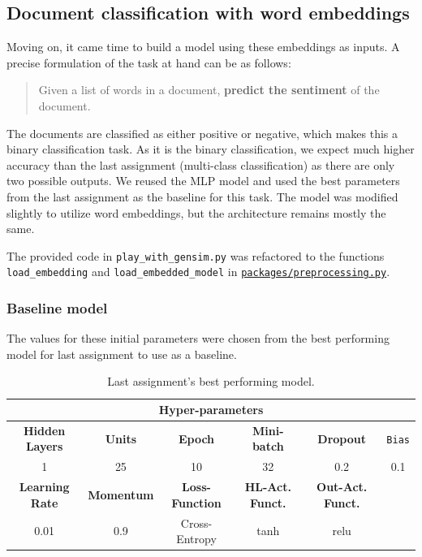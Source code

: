 \subsection{Document classification with word embeddings}
\label{chap:Document classification with word embeddings}
\quad Moving on, it came time to build a model using these embeddings as inputs. A precise formulation of the task at hand can be as follows:

\begin{quote}
    Given a list of words in a document, \textbf{predict the sentiment} of the document. 
\end{quote} 

The documents are classified as either positive or negative, which makes this a binary classification task. As it is the binary classification, we expect much higher accuracy than the last assignment (multi-class classification) as there are only two possible outputs. We reused the MLP model and used the best parameters from the last assignment as the baseline for this task. The model was modified slightly to utilize word embeddings, but the architecture remains mostly the same. 

The provided code in \texttt{play\_with\_gensim.py} was refactored to the functions \texttt{load\_embedding} and \texttt{load\_embedded\_model} in \href{https://github.uio.no/fabior/IN5550/blob/master/Oblig2/packages/preprocessing.py}{\texttt{packages/preprocessing.py}}.
\newline

\subsubsection{Baseline model}
The values for these initial parameters were chosen from the best performing model for last assignment to use as a baseline.
\begin{table}[H]
    \centering
    \begin{tabular}{ |c|c|c|c|c|c| }
        \hline
        \multicolumn{6}{|c|}{\textbf{Hyper-parameters}} \\
        \hline
        \textbf{Hidden Layers} & \textbf{Units} & \textbf{Epoch} & \textbf{Mini-batch} & \textbf{Dropout} & \texttt{Bias} \\
        \hline
        1 & 25 & 10 & 32 & 0.2 & 0.1 \\
        \hline
         \textbf{Learning Rate} & \textbf{Momentum} & \textbf{Loss-Function} & \textbf{HL-Act. Funct.} & \textbf{Out-Act. Funct.} &\\
        \hline
        0.01 & 0.9 & Cross-Entropy & tanh & relu & \\
        \hline
    \end{tabular}
    \caption{Last assignment's best performing model.}
    \label{table:baseline_params}
\end{table}

